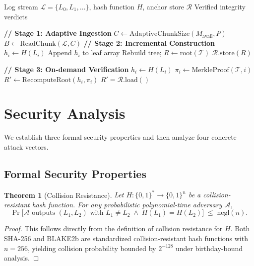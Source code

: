 \documentclass[preprint,12pt]{elsarticle}
\newtheorem{theorem}{Theorem}
\begin{document}
\begin{algorithm}[t]
\caption{Adaptive Merkle-Tree Ingestion and Verification}
\label{alg:pipeline}
\begin{algorithmic}[1]
\Require Log stream $\mathcal{L} = \{L_0, L_1, \ldots\}$, hash function $H$, anchor store $\mathcal{R}$
\Ensure Verified integrity verdicts

\Statex \textcolor{cPrimary}{\textbf{// Stage 1: Adaptive Ingestion}}
  \State $C \gets \mathrm{AdaptiveChunkSize}(M_{\text{avail}}, P)$ 
  \State $B \gets \mathrm{ReadChunk}(\mathcal{L}, C)$
  \Statex \textcolor{cPrimary}{\textbf{// Stage 2: Incremental Construction}}
    \State $h_i \gets H(L_i)$
    \State Append $h_i$ to leaf array
  \EndFor
  \State Rebuild tree; $R \gets \mathrm{root}(\mathcal{T})$
  \State $\mathcal{R}.\mathrm{store}(R)$ 
\EndWhile

\Statex
\Statex \textcolor{cPrimary}{\textbf{// Stage 3: On-demand Verification}}
  \State $h_i \gets H(L_i)$
  \State $\pi_i \gets \mathrm{MerkleProof}(\mathcal{T}, i)$ 
  \State $R' \gets \mathrm{RecomputeRoot}(h_i, \pi_i)$
  \State \Return $R' = \mathcal{R}.\mathrm{load}()$
\EndFunction
\end{algorithmic}
\end{algorithm}


\section{Security Analysis}
\label{sec:security}

We establish three formal security properties and then analyze four concrete attack vectors.

\subsection{Formal Security Properties}

\begin{theorem}[Collision Resistance]
\label{thm:collision}
Let $H : \{0,1\}^* \to \{0,1\}^n$ be a collision-resistant hash function.
For any probabilistic polynomial-time adversary $\mathcal{A}$,
\[
  \Pr\bigl[\mathcal{A} \text{ outputs } (L_1, L_2) \text{ with }
    L_1 \neq L_2 \;\wedge\; H(L_1) = H(L_2)\bigr]
  \;\le\; \mathrm{negl}(n).
\]
\end{theorem}
\begin{proof}
This follows directly from the definition of collision resistance for $H$.
Both SHA-256 \citep{dang2015nist} and BLAKE2b \citep{aumasson2013blake2} are standardized collision-resistant hash functions with $n = 256$, yielding collision probability bounded by $2^{-128}$ under birthday-bound analysis.
\end{proof}
\end{document}
